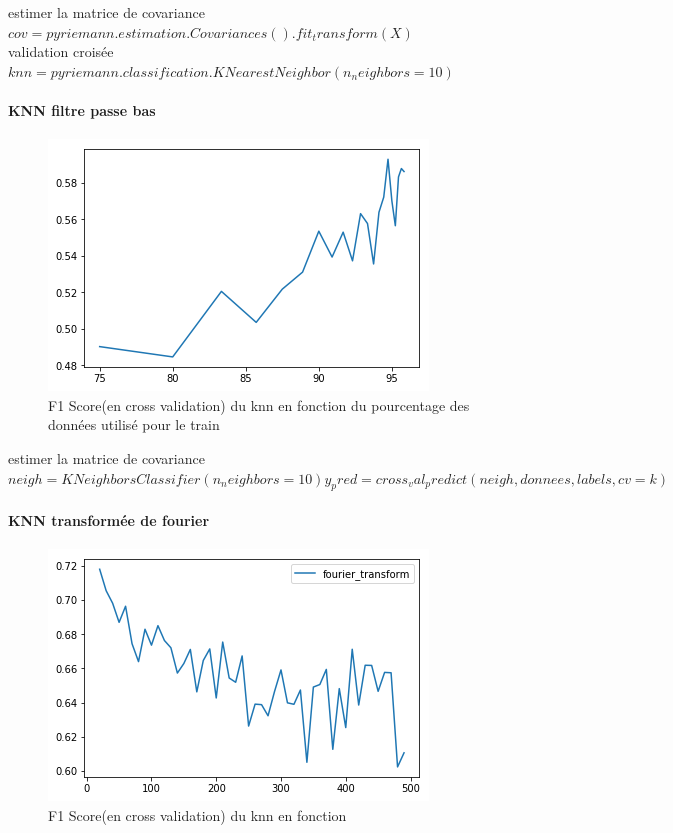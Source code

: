 \documentclass{article}
\begin{document}
estimer la matrice de covariance\\
$
cov = pyriemann.estimation.Covariances().fit_transform(X)
$
\\
validation croisée\\
$
knn = pyriemann.classification.KNearestNeighbor(n_neighbors=10)
$

\paragraph{KNN filtre passe bas }
\begin{figure}[H]
\begin{center}
\includegraphics[scale=0.7]{images/knn_passe_bas_f1Score.png}
\end{center}
\caption{F1 Score(en cross validation) du knn en fonction du pourcentage des données utilisé pour le train}
\end{figure}

estimer la matrice de covariance\\
$
neigh = KNeighborsClassifier(n_neighbors=10)
    y_pred = cross_val_predict(neigh,donnees,labels,cv=k)
$
\\

\paragraph{KNN transformée de fourier }
\begin{figure}[H]
\begin{center}
\includegraphics[scale=0.7]{images/knn_tf_f1Score.png}
\end{center}
\caption{F1 Score(en cross validation) du knn en fonction}
\end{figure}
\end{document}

